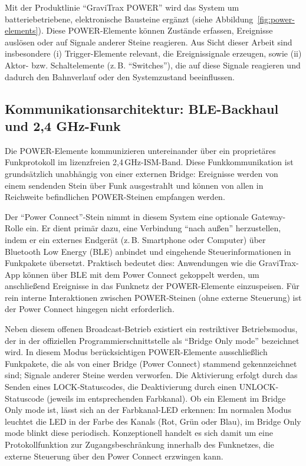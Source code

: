Mit der Produktlinie \enquote{GraviTrax POWER} wird das System um batteriebetriebene, elektronische Bausteine ergänzt (siehe Abbildung~\ref{fig:power-elements}).
Diese POWER-Elemente können Zustände erfassen, Ereignisse auslösen oder auf Signale anderer Steine reagieren.
Aus Sicht dieser Arbeit sind insbesondere (i) Trigger-Elemente relevant, die Ereignissignale erzeugen, sowie (ii) Aktor- bzw. Schaltelemente (z.\,B. \enquote{Switches}), die auf diese Signale reagieren und dadurch den Bahnverlauf oder den Systemzustand beeinflussen.

\subsection[Kommunikationsarchitektur: BLE-Backhaul und 2,4 GHz-Funk]{Kommunikationsarchitektur: BLE-Backhaul und 2,4 GHz-Funk}
Die POWER-Elemente kommunizieren untereinander über ein proprietäres Funkprotokoll im lizenzfreien 2{,}4\,GHz-ISM-Band.
Diese Funkkommunikation ist grundsätzlich unabhängig von einer externen Bridge: Ereignisse werden von einem sendenden Stein über Funk ausgestrahlt und können von allen in Reichweite befindlichen POWER-Steinen empfangen werden.

Der \enquote{Power Connect}-Stein nimmt in diesem System eine optionale Gateway-Rolle ein.
Er dient primär dazu, eine Verbindung \enquote{nach außen} herzustellen, indem er ein externes Endgerät (z.\,B. Smartphone oder Computer) über Bluetooth Low Energy (BLE) anbindet und eingehende Steuerinformationen in Funkpakete übersetzt.
Praktisch bedeutet dies: Anwendungen wie die GraviTrax-App können über BLE mit dem Power Connect gekoppelt werden, um anschließend Ereignisse in das Funknetz der POWER-Elemente einzuspeisen.
Für rein interne Interaktionen zwischen POWER-Steinen (ohne externe Steuerung) ist der Power Connect hingegen nicht erforderlich.

Neben diesem offenen Broadcast-Betrieb existiert ein restriktiver Betriebsmodus, der in der offiziellen Programmierschnittstelle als \enquote{Bridge Only mode} bezeichnet wird.
In diesem Modus berücksichtigen POWER-Elemente ausschließlich Funkpakete, die als von einer Bridge (Power Connect) stammend gekennzeichnet sind; Signale anderer Steine werden verworfen.
Die Aktivierung erfolgt durch das Senden eines LOCK-Statuscodes, die Deaktivierung durch einen UNLOCK-Statuscode (jeweils im entsprechenden Farbkanal).
Ob ein Element im Bridge Only mode ist, lässt sich an der Farbkanal-LED erkennen: Im normalen Modus leuchtet die LED in der Farbe des Kanals (Rot, Grün oder Blau), im Bridge Only mode blinkt diese periodisch.
Konzeptionell handelt es sich damit um eine Protokollfunktion zur Zugangsbeschränkung innerhalb des Funknetzes, die externe Steuerung über den Power Connect erzwingen kann.

